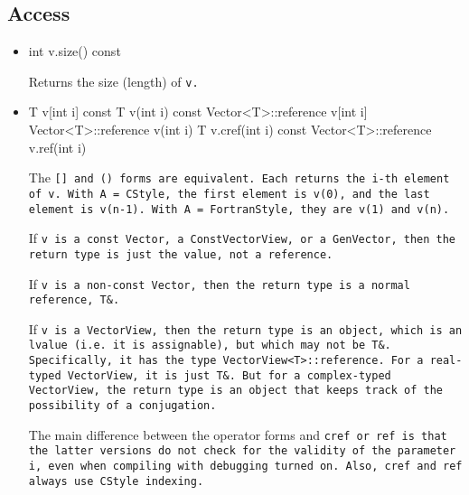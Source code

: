 \subsection{Access}
\label{Vector_Access}

\begin{itemize}
\item
\begin{tmvcode}
int v.size() const
\end{tmvcode}
Returns the size (length) of \tt{v}.

\item
\begin{tmvcode}
T v[int i] const
T v(int i) const
Vector<T>::reference v[int i]
Vector<T>::reference v(int i)
T v.cref(int i) const
Vector<T>::reference v.ref(int i)
\end{tmvcode}
The \tt{[]} and \tt{()} forms are equivalent.  Each returns the \tt{i}-th element of \tt{v}.  
With \tt{A = CStyle}, the first 
element is \tt{v(0)}, and the last element is \tt{v(n-1)}.
With \tt{A = FortranStyle}, they are \tt{v(1)} and \tt{v(n)}.

If \tt{v} is a 
\tt{const Vector}, a \tt{ConstVectorView}, or a \tt{GenVector}, 
then the return type is just the value, not a reference.

If \tt{v} is a 
non-\tt{const Vector}, then the return type is a normal reference, \tt{T\&}.

If \tt{v} is a \tt{VectorView}, then the return type is an object, which is
an lvalue (i.e. it is assignable), but which may not be \tt{T\&}.
Specifically, it has the type \tt{VectorView<T>::reference}.
For a real-typed \tt{VectorView}, it is just \tt{T\&}.  But for a
complex-typed \tt{VectorView}, the return type is an object that keeps track of the
possibility of a conjugation.

The main difference between the operator forms and \tt{cref} or \tt{ref} is that the latter versions do not
check for the validity of the parameter \tt{i}, even when compiling with debugging turned on.
Also, \tt{cref} and \tt{ref} always use \tt{CStyle} indexing.



\end{itemize}
